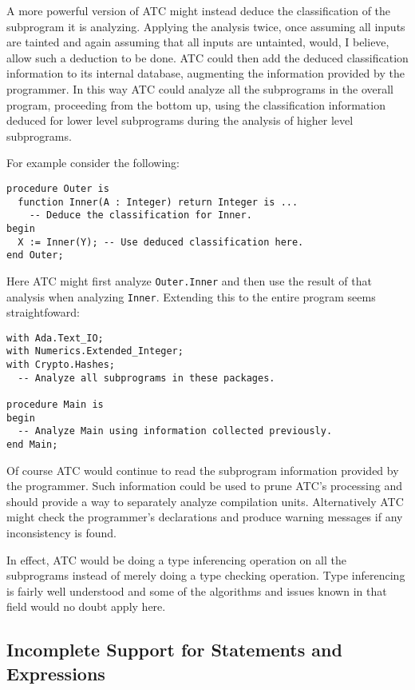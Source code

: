 \documentclass{article}
\begin{document}
A more powerful version of ATC might instead deduce the classification of the subprogram it is analyzing. Applying the analysis twice, once assuming all inputs are tainted and again assuming that all inputs are untainted, would, I believe, allow such a deduction to be done. ATC could then add the deduced classification information to its internal database, augmenting the information provided by the programmer. In this way ATC could analyze all the subprograms in the overall program, proceeding from the bottom up, using the classification information deduced for lower level subprograms during the analysis of higher level subprograms.

For example consider the following:

\begin{verbatim}
procedure Outer is
  function Inner(A : Integer) return Integer is ...
    -- Deduce the classification for Inner.
begin
  X := Inner(Y); -- Use deduced classification here.
end Outer;
\end{verbatim}

Here ATC might first analyze \texttt{Outer.Inner} and then use the result of that analysis when analyzing \texttt{Inner}. Extending this to the entire program seems straightfoward:

\begin{verbatim}
with Ada.Text_IO;
with Numerics.Extended_Integer;
with Crypto.Hashes;
  -- Analyze all subprograms in these packages.

procedure Main is
begin
  -- Analyze Main using information collected previously.
end Main;
\end{verbatim}

Of course ATC would continue to read the subprogram information provided by the programmer. Such information could be used to prune ATC's processing and should provide a way to separately analyze compilation units. Alternatively ATC might check the programmer's declarations and produce warning messages if any inconsistency is found.

In effect, ATC would be doing a type inferencing operation on all the subprograms instead of merely doing a type checking operation. Type inferencing is fairly well understood and some of the algorithms and issues known in that field would no doubt apply here.

\subsection{Incomplete Support for Statements and Expressions}
\end{document}
